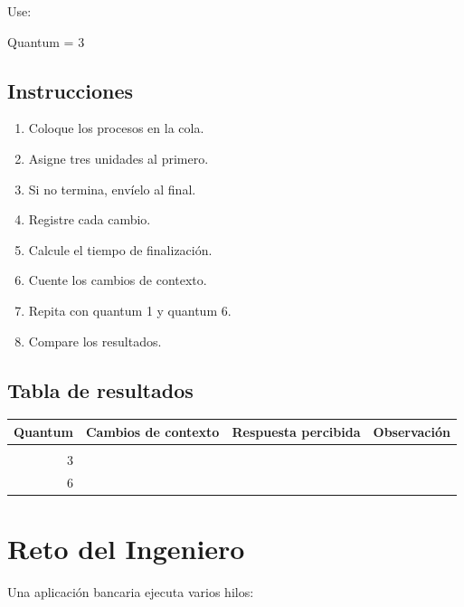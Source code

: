 \documentclass[
  spanish,
  letterpaper,
]{scrbook}
\newenvironment{Shaded}{\begin{snugshade}}{\end{snugshade}}
\newcommand{\NormalTok}[1]{\textcolor[rgb]{0.00,0.23,0.31}{#1}}
\newcounter{none} %
\providecommand{\tightlist}{%
  \setlength{\itemsep}{0pt}\setlength{\parskip}{0pt}}
\begin{document}
Use:

\begin{Shaded}
\begin{Highlighting}[]
\NormalTok{Quantum = 3}
\end{Highlighting}
\end{Shaded}

\section{Instrucciones}\label{instrucciones}

\begin{enumerate}
\def\labelenumi{\arabic{enumi}.}
\tightlist
\item
  Coloque los procesos en la cola.
\item
  Asigne tres unidades al primero.
\item
  Si no termina, envíelo al final.
\item
  Registre cada cambio.
\item
  Calcule el tiempo de finalización.
\item
  Cuente los cambios de contexto.
\item
  Repita con quantum 1 y quantum 6.
\item
  Compare los resultados.
\end{enumerate}

\section{Tabla de resultados}\label{tabla-de-resultados}

{\def\LTcaptype{none} %
\begin{longtable}[]{@{}rrll@{}}
\toprule\noalign{}
Quantum & Cambios de contexto & Respuesta percibida & Observación \\
\midrule\noalign{}
\endhead
\bottomrule\noalign{}
\endlastfoot
1 & & & \\
3 & & & \\
6 & & & \\
\end{longtable}
}


\chapter{Reto del Ingeniero}\label{reto-del-ingeniero-1}

Una aplicación bancaria ejecuta varios hilos:
\end{document}
